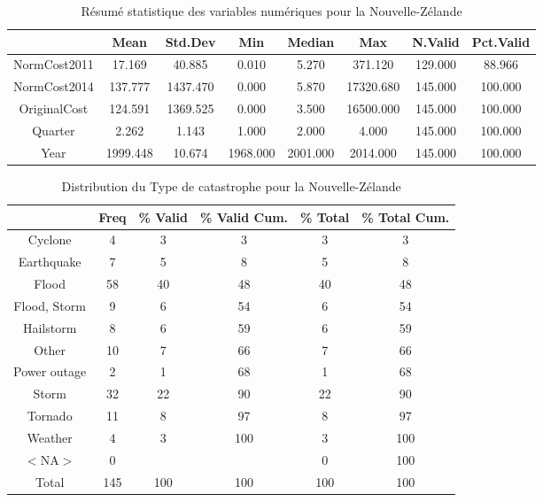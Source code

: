 \begin{table}[ht]
\centering
\begin{tabular}{cccccccc}
  \hline
 & Mean & Std.Dev & Min & Median & Max & N.Valid & Pct.Valid \\ 
  \hline
NormCost2011 & 17.169 & 40.885 & 0.010 & 5.270 & 371.120 & 129.000 & 88.966 \\ 
  NormCost2014 & 137.777 & 1437.470 & 0.000 & 5.870 & 17320.680 & 145.000 & 100.000 \\ 
  OriginalCost & 124.591 & 1369.525 & 0.000 & 3.500 & 16500.000 & 145.000 & 100.000 \\ 
  Quarter & 2.262 & 1.143 & 1.000 & 2.000 & 4.000 & 145.000 & 100.000 \\ 
  Year & 1999.448 & 10.674 & 1968.000 & 2001.000 & 2014.000 & 145.000 & 100.000 \\ 
   \hline
\end{tabular}
\caption{Résumé statistique des variables numériques pour la Nouvelle-Zélande} 
\label{tab:3.3}
\end{table}%
\begin{table}[ht]
\centering
\begin{tabular}{cccccc}
  \hline
 & Freq & \% Valid & \% Valid Cum. & \% Total & \% Total Cum. \\ 
  \hline
Cyclone & 4 & 3 & 3 & 3 & 3 \\ 
  Earthquake & 7 & 5 & 8 & 5 & 8 \\ 
  Flood & 58 & 40 & 48 & 40 & 48 \\ 
  Flood, Storm & 9 & 6 & 54 & 6 & 54 \\ 
  Hailstorm & 8 & 6 & 59 & 6 & 59 \\ 
  Other & 10 & 7 & 66 & 7 & 66 \\ 
  Power outage & 2 & 1 & 68 & 1 & 68 \\ 
  Storm & 32 & 22 & 90 & 22 & 90 \\ 
  Tornado & 11 & 8 & 97 & 8 & 97 \\ 
  Weather & 4 & 3 & 100 & 3 & 100 \\ 
  $<$NA$>$ & 0 &  &  & 0 & 100 \\ 
  Total & 145 & 100 & 100 & 100 & 100 \\ 
   \hline
\end{tabular}
\caption{Distribution du Type de catastrophe pour la Nouvelle-Zélande} 
\label{tab:3.4}
\end{table}


